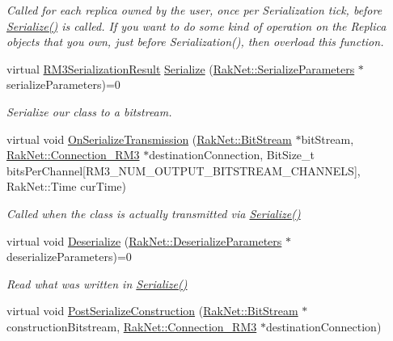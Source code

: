 \begin{DoxyCompactItemize}
\begin{DoxyCompactList}\small\item\em Called for each replica owned by the user, once per Serialization tick, before \hyperlink{class_rak_net_1_1_replica3_a6e59b6a75b22441365145bf552f89e09}{Serialize()} is called. If you want to do some kind of operation on the Replica objects that you own, just before Serialization(), then overload this function. \end{DoxyCompactList}\item 
virtual \hyperlink{group___r_e_p_l_i_c_a___m_a_n_a_g_e_r___g_r_o_u_p3_ga993da25eb23b67455e2438971c51429c}{R\-M3\-Serialization\-Result} \hyperlink{class_rak_net_1_1_replica3_a6e59b6a75b22441365145bf552f89e09}{Serialize} (\hyperlink{struct_rak_net_1_1_serialize_parameters}{Rak\-Net\-::\-Serialize\-Parameters} $\ast$serialize\-Parameters)=0
\begin{DoxyCompactList}\small\item\em Serialize our class to a bitstream. \end{DoxyCompactList}\item 
virtual void \hyperlink{class_rak_net_1_1_replica3_a0133383d790ca6e3c9d39e95ac9add8b}{On\-Serialize\-Transmission} (\hyperlink{class_rak_net_1_1_bit_stream}{Rak\-Net\-::\-Bit\-Stream} $\ast$bit\-Stream, \hyperlink{class_rak_net_1_1_connection___r_m3}{Rak\-Net\-::\-Connection\-\_\-\-R\-M3} $\ast$destination\-Connection, Bit\-Size\-\_\-t bits\-Per\-Channel\mbox{[}R\-M3\-\_\-\-N\-U\-M\-\_\-\-O\-U\-T\-P\-U\-T\-\_\-\-B\-I\-T\-S\-T\-R\-E\-A\-M\-\_\-\-C\-H\-A\-N\-N\-E\-L\-S\mbox{]}, Rak\-Net\-::\-Time cur\-Time)
\begin{DoxyCompactList}\small\item\em Called when the class is actually transmitted via \hyperlink{class_rak_net_1_1_replica3_a6e59b6a75b22441365145bf552f89e09}{Serialize()} \end{DoxyCompactList}\item 
virtual void \hyperlink{class_rak_net_1_1_replica3_adc3ca56ef4fe3ad95e381c7d72f0956f}{Deserialize} (\hyperlink{struct_rak_net_1_1_deserialize_parameters}{Rak\-Net\-::\-Deserialize\-Parameters} $\ast$deserialize\-Parameters)=0
\begin{DoxyCompactList}\small\item\em Read what was written in \hyperlink{class_rak_net_1_1_replica3_a6e59b6a75b22441365145bf552f89e09}{Serialize()} \end{DoxyCompactList}\item 
\hypertarget{class_rak_net_1_1_replica3_a1b2a1d043e575f738e204d1d3a41c5a5}{virtual void \hyperlink{class_rak_net_1_1_replica3_a1b2a1d043e575f738e204d1d3a41c5a5}{Post\-Serialize\-Construction} (\hyperlink{class_rak_net_1_1_bit_stream}{Rak\-Net\-::\-Bit\-Stream} $\ast$construction\-Bitstream, \hyperlink{class_rak_net_1_1_connection___r_m3}{Rak\-Net\-::\-Connection\-\_\-\-R\-M3} $\ast$destination\-Connection)}\label{class_rak_net_1_1_replica3_a1b2a1d043e575f738e204d1d3a41c5a5}


\end{DoxyCompactItemize}
